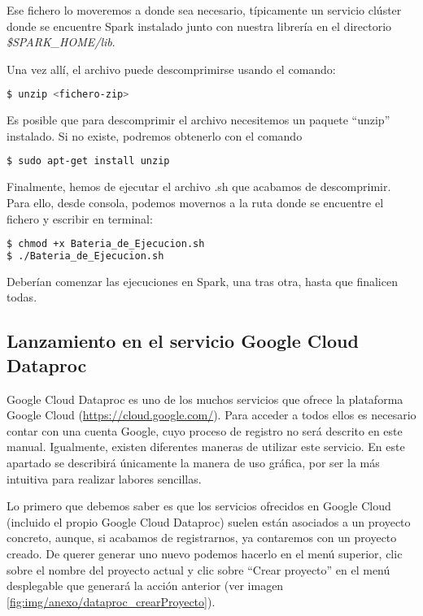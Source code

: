 Ese fichero lo moveremos a donde sea necesario, típicamente un servicio clúster donde se encuentre Spark instalado junto con nuestra librería en el directorio \textit{\$SPARK\_HOME/lib}.

Una vez allí, el archivo puede descomprimirse usando el comando: 

\begin{lstlisting}[language=bash]
$ unzip <fichero-zip>
\end{lstlisting}

Es posible que para descomprimir el archivo necesitemos un paquete ``unzip'' instalado. Si no existe, podremos obtenerlo con el comando

\begin{lstlisting}[language=bash]
$ sudo apt-get install unzip
\end{lstlisting}

Finalmente, hemos de ejecutar el archivo .sh que acabamos de descomprimir. Para ello, desde consola, podemos movernos a la ruta donde se encuentre el fichero y escribir en terminal:

\begin{lstlisting}[language=bash]
$ chmod +x Bateria_de_Ejecucion.sh
$ ./Bateria_de_Ejecucion.sh
\end{lstlisting}

Deberían comenzar las ejecuciones en Spark, una tras otra, hasta que finalicen todas.

\subsection{Lanzamiento en el servicio Google Cloud Dataproc}

Google Cloud Dataproc es uno de los muchos servicios que ofrece la plataforma Google Cloud (\url{https://cloud.google.com/}). Para acceder a todos ellos es necesario contar con una cuenta Google, cuyo proceso de registro no será descrito en este manual. Igualmente, existen diferentes maneras de utilizar este servicio. En este apartado se describirá únicamente la manera de uso gráfica, por ser la más intuitiva para realizar labores sencillas.

Lo primero que debemos saber es que los servicios ofrecidos en Google Cloud (incluido el propio Google Cloud Dataproc) suelen están asociados a un proyecto concreto, aunque, si acabamos de registrarnos, ya contaremos con un proyecto creado. De querer generar uno nuevo podemos hacerlo en el menú superior, clic sobre el nombre del proyecto actual y clic sobre ``Crear proyecto'' en el menú desplegable que generará la acción anterior (ver imagen \ref{fig:img/anexo/dataproc_crearProyecto}).

